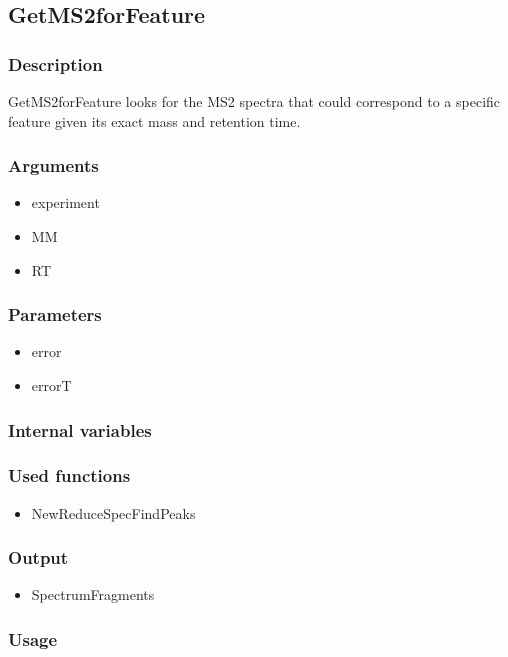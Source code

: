 \subsection{GetMS2forFeature}\label{GetMS2forFeature}
\subsubsection{Description}
GetMS2forFeature looks for the MS2 spectra that could correspond to a specific feature given its exact mass and retention time.
\subsubsection{Arguments}
\begin{itemize}
\item experiment
\item MM
\item RT
\end{itemize}
\subsubsection{Parameters}
\begin{itemize}
\item error
\item errorT
\end{itemize}
\subsubsection{Internal variables}
\subsubsection{Used functions}
\begin{itemize}
\item NewReduceSpecFindPeaks
\end{itemize}
\subsubsection{Output}
\begin{itemize}
\item SpectrumFragments %
\end{itemize}
\subsubsection{Usage}



